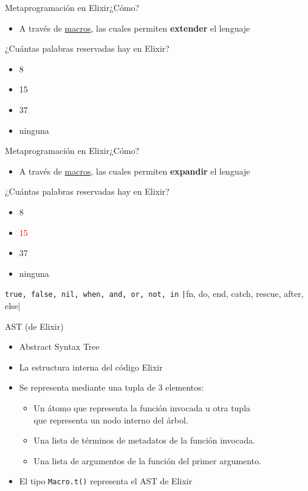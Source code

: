 \documentclass[14pt,aspectratio=169]{beamer}
\begin{document}
\begin{frame}{Metaprogramación en Elixir}{¿Cómo?}
  \begin{itemize}
    \item A través de \underline{macros}, las cuales permiten \textbf{extender}
    el lenguaje
  \end{itemize}
  \begin{block}{¿Cuántas palabras reservadas hay en Elixir?}
    \begin{itemize}
      \item 8
      \item 15
      \item 37
      \item ninguna
    \end{itemize}
  \end{block}
\end{frame}

\begin{frame}{Metaprogramación en Elixir}{¿Cómo?}
  \begin{itemize}
    \item A través de \underline{macros}, las cuales permiten \textbf{expandir}
    el lenguaje
  \end{itemize}
  \begin{block}{¿Cuántas palabras reservadas hay en Elixir?\footnotemark[2]}
    \begin{itemize}
      \item 8
      \item \textcolor{red}{15}
      \item 37
      \item ninguna
    \end{itemize}
    \texttt{true, false, nil, when, and, or, not, in}
    \texttt|fn, do, end, catch, rescue, after, else|
  \end{block}
\end{frame}

\begin{frame}{AST (de Elixir)}
  \begin{itemize}
    \item Abstract Syntax Tree
    \item La estructura interna del código Elixir
    \item Se representa mediante una tupla de 3 elementos:
    \begin{itemize}
      \item Un átomo que representa la función invocada u otra tupla\\
      que representa un nodo interno del árbol.
      \item Una lista de términos de metadatos de la función invocada.
      \item Una lista de argumentos de la función del primer argumento.
    \end{itemize}
    \item El tipo \texttt{Macro.t()} representa el AST de Elixir
  \end{itemize}
\end{frame}
\end{document}
